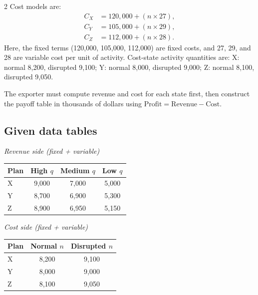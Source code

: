\documentclass[12pt]{article}
\begin{document}
\begin{multicols}{2}
				Cost models are:
				\[
				\begin{aligned}
				C_X &= 120{,}000 + (n\times27),\\
				C_Y &= 105{,}000 + (n\times29),\\
				C_Z &= 112{,}000 + (n\times28).
				\end{aligned}
				\]
				Here, the fixed terms (120{,}000, 105{,}000, 112{,}000) are fixed costs, and 27, 29, and 28 are variable cost per unit of activity.
				Cost-state activity quantities are:
				X: normal 8{,}200, disrupted 9{,}100;
				Y: normal 8{,}000, disrupted 9{,}000;
				Z: normal 8{,}100, disrupted 9{,}050.
				
				The exporter must compute revenue and cost for each state first, then construct the payoff table in thousands of dollars using
				\(\text{Profit}=\text{Revenue}-\text{Cost}\).
				\subsection*{Given data tables}
				\begin{center}
					\begin{minipage}[t]{0.48\linewidth}
						\textit{Revenue side (fixed + variable)}
						\begin{center}
							\begin{tabular}{l c c c}
								\toprule
								Plan & High $q$ & Medium $q$ & Low $q$ \\
								\midrule
								X & 9{,}000 & 7{,}000 & 5{,}000 \\
								Y & 8{,}700 & 6{,}900 & 5{,}300 \\
								Z & 8{,}900 & 6{,}950 & 5{,}150 \\
								\bottomrule
							\end{tabular}
						\end{center}
					\end{minipage}
					\hfill
					\begin{minipage}[t]{0.48\linewidth}
						\textit{Cost side (fixed + variable)}
						\begin{center}
							\begin{tabular}{l c c}
								\toprule
								Plan & Normal $n$ & Disrupted $n$ \\
								\midrule
								X & 8{,}200 & 9{,}100 \\
								Y & 8{,}000 & 9{,}000 \\
								Z & 8{,}100 & 9{,}050 \\
								\bottomrule
							\end{tabular}
						\end{center}
					\end{minipage}
				\end{center}

	\end{multicols}
\end{document}
